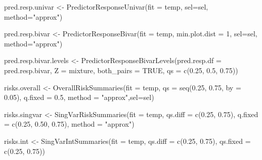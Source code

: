 \documentclass[
]{book}
\newenvironment{Shaded}{\begin{snugshade}}{\end{snugshade}}
\newcommand{\AttributeTok}[1]{\textcolor[rgb]{0.77,0.63,0.00}{#1}}
\newcommand{\ConstantTok}[1]{\textcolor[rgb]{0.00,0.00,0.00}{#1}}
\newcommand{\DecValTok}[1]{\textcolor[rgb]{0.00,0.00,0.81}{#1}}
\newcommand{\FloatTok}[1]{\textcolor[rgb]{0.00,0.00,0.81}{#1}}
\newcommand{\FunctionTok}[1]{\textcolor[rgb]{0.00,0.00,0.00}{#1}}
\newcommand{\NormalTok}[1]{#1}
\newcommand{\OtherTok}[1]{\textcolor[rgb]{0.56,0.35,0.01}{#1}}
\newcommand{\StringTok}[1]{\textcolor[rgb]{0.31,0.60,0.02}{#1}}
\begin{document}
\begin{Shaded}
\begin{Highlighting}[]
\NormalTok{pred.resp.univar }\OtherTok{\textless{}{-}} \FunctionTok{PredictorResponseUnivar}\NormalTok{(}\AttributeTok{fit =}\NormalTok{ temp, }\AttributeTok{sel=}\NormalTok{sel, }\AttributeTok{method=}\StringTok{"approx"}\NormalTok{)}

\NormalTok{pred.resp.bivar  }\OtherTok{\textless{}{-}} \FunctionTok{PredictorResponseBivar}\NormalTok{(}\AttributeTok{fit =}\NormalTok{ temp,  }\AttributeTok{min.plot.dist =} \DecValTok{1}\NormalTok{, }\AttributeTok{sel=}\NormalTok{sel, }
                                           \AttributeTok{method=}\StringTok{"approx"}\NormalTok{)}

\NormalTok{pred.resp.bivar.levels }\OtherTok{\textless{}{-}} \FunctionTok{PredictorResponseBivarLevels}\NormalTok{(}\AttributeTok{pred.resp.df =}\NormalTok{ pred.resp.bivar, }
                         \AttributeTok{Z =}\NormalTok{ mixture, }\AttributeTok{both\_pairs =} \ConstantTok{TRUE}\NormalTok{, }\AttributeTok{qs =} \FunctionTok{c}\NormalTok{(}\FloatTok{0.25}\NormalTok{, }\FloatTok{0.5}\NormalTok{, }\FloatTok{0.75}\NormalTok{))}

\NormalTok{risks.overall }\OtherTok{\textless{}{-}} \FunctionTok{OverallRiskSummaries}\NormalTok{(}\AttributeTok{fit =}\NormalTok{ temp, }\AttributeTok{qs =} \FunctionTok{seq}\NormalTok{(}\FloatTok{0.25}\NormalTok{, }\FloatTok{0.75}\NormalTok{, }\AttributeTok{by =} \FloatTok{0.05}\NormalTok{), }
                                      \AttributeTok{q.fixed =} \FloatTok{0.5}\NormalTok{, }\AttributeTok{method =} \StringTok{"approx"}\NormalTok{,}\AttributeTok{sel=}\NormalTok{sel)}

\NormalTok{risks.singvar }\OtherTok{\textless{}{-}} \FunctionTok{SingVarRiskSummaries}\NormalTok{(}\AttributeTok{fit =}\NormalTok{ temp, }\AttributeTok{qs.diff =} \FunctionTok{c}\NormalTok{(}\FloatTok{0.25}\NormalTok{, }\FloatTok{0.75}\NormalTok{),}
                                    \AttributeTok{q.fixed =} \FunctionTok{c}\NormalTok{(}\FloatTok{0.25}\NormalTok{, }\FloatTok{0.50}\NormalTok{, }\FloatTok{0.75}\NormalTok{), }\AttributeTok{method =} \StringTok{"approx"}\NormalTok{)}

\NormalTok{risks.int }\OtherTok{\textless{}{-}} \FunctionTok{SingVarIntSummaries}\NormalTok{(}\AttributeTok{fit =}\NormalTok{ temp, }\AttributeTok{qs.diff =} \FunctionTok{c}\NormalTok{(}\FloatTok{0.25}\NormalTok{, }\FloatTok{0.75}\NormalTok{),}
                                 \AttributeTok{qs.fixed =} \FunctionTok{c}\NormalTok{(}\FloatTok{0.25}\NormalTok{, }\FloatTok{0.75}\NormalTok{))}
\end{Highlighting}
\end{Shaded}
\end{document}
